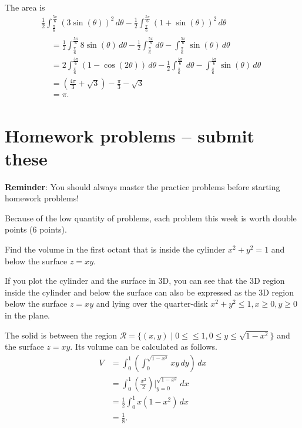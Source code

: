\begin{pracsol}
  The area is
  \begin{multline*}
    \frac12\int_{\frac{\pi}6}^{\frac{5\pi}6}(3\sin(\theta))^2\,d\theta -\frac12\int_{\frac{\pi}6}^{\frac{5\pi}6}(1+\sin(\theta))^2\,d\theta\\
    \begin{aligned}
    &= \frac12\int_{\frac{\pi}6}^{\frac{5\pi}6}8\sin(\theta)\,d\theta-\frac12\int_{\frac{\pi}6}^{\frac{5\pi}6}d\theta-\int_{\frac{\pi}6}^{\frac{5\pi}6}\sin(\theta)\,d\theta\\
    &= 2\int_{\frac{\pi}6}^{\frac{5\pi}6}(1-\cos(2\theta))\,d\theta-\frac12\int_{\frac{\pi}6}^{\frac{5\pi}6}\,d\theta-\int_{\frac{\pi}6}^{\frac{5\pi}6}\sin(\theta)\,d\theta\\
    &= \left(\frac{4\pi}{3}+\sqrt3\right)-\frac{\pi}{3}-\sqrt3\\
    &= \pi.
    \end{aligned}
  \end{multline*}
\end{pracsol}

\newpage

\section{Homework problems -- submit these}

{\color{red}\textbf{Reminder}: You should always master the practice problems before starting homework problems!}

Because of the low quantity of problems, each problem this week is worth double points (6 points).

\begin{problem}
  Find the volume in the first octant that is inside the cylinder $x^2+y^2=1$ and below the surface $z=xy$.
\end{problem}
\begin{solution}
  If you plot the cylinder and the surface in 3D, you can see that the 3D region inside the cylinder and below the surface can also be expressed as the 3D region below the surface $z=xy$ and lying over the quarter-disk $x^2+y^2\leq 1,x\geq 0,y\geq 0$ in the plane.

  The solid is between the region $\mathcal R=\{(x,y)\mid 0\leq \leq 1, 0\leq y\leq\sqrt{1-x^2}\}$ and the surface $z=xy$. Its volume can be calculated as follows.
  \[\begin{split}
    V &= \int_0^1\left(\int_0^{\sqrt{1-x^2}} xy\,dy\right)\,dx\\
     &= \int_0^1\left(\frac{x^2}{2}\right)\Big|_{y=0}^{\sqrt{1-x^2}}\,dx\\
    &= \frac12\int_0^1 x(1-x^2)\,dx\\
    &= \frac18.
  \end{split}\]
\end{solution}


